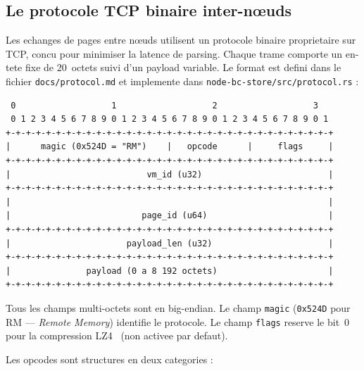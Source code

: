 \subsection{Le protocole TCP binaire inter-n\oe{}uds}
\label{subsec:protocole-tcp}

Les echanges de pages entre n\oe{}uds utilisent un protocole binaire proprietaire sur TCP, concu pour minimiser la latence de parsing. Chaque trame comporte un en-tete fixe de 20~octets suivi d'un payload variable. Le format est defini dans le fichier \texttt{docs/protocol.md} et implemente dans \texttt{node-bc-store/src/protocol.rs} :

\begin{verbatim}
 0                   1                   2                   3
 0 1 2 3 4 5 6 7 8 9 0 1 2 3 4 5 6 7 8 9 0 1 2 3 4 5 6 7 8 9 0 1
+-+-+-+-+-+-+-+-+-+-+-+-+-+-+-+-+-+-+-+-+-+-+-+-+-+-+-+-+-+-+-+-+
|      magic (0x524D = "RM")    |   opcode      |     flags     |
+-+-+-+-+-+-+-+-+-+-+-+-+-+-+-+-+-+-+-+-+-+-+-+-+-+-+-+-+-+-+-+-+
|                           vm_id (u32)                         |
+-+-+-+-+-+-+-+-+-+-+-+-+-+-+-+-+-+-+-+-+-+-+-+-+-+-+-+-+-+-+-+-+
|                                                               |
|                          page_id (u64)                        |
+-+-+-+-+-+-+-+-+-+-+-+-+-+-+-+-+-+-+-+-+-+-+-+-+-+-+-+-+-+-+-+-+
|                       payload_len (u32)                       |
+-+-+-+-+-+-+-+-+-+-+-+-+-+-+-+-+-+-+-+-+-+-+-+-+-+-+-+-+-+-+-+-+
|               payload (0 a 8 192 octets)                      |
+-+-+-+-+-+-+-+-+-+-+-+-+-+-+-+-+-+-+-+-+-+-+-+-+-+-+-+-+-+-+-+-+
\end{verbatim}

Tous les champs multi-octets sont en big-endian. Le champ \texttt{magic} (\texttt{0x524D} pour \og RM \fg{} --- \textit{Remote Memory}) identifie le protocole. Le champ \texttt{flags} reserve le bit~0 pour la compression LZ4~\cite{lz4_compression} (non activee par defaut).

Les opcodes sont structures en deux categories :


